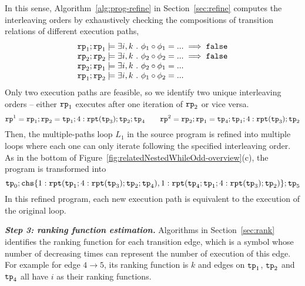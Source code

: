 In this sense, Algorithm~\ref{alg:prog-refine} in Section~\ref{sec:refine} computes the interleaving orders
by exhaustively checking the compositions of transition relations of different execution paths,
\begin{equation}
    \begin{array}{l}
        \mathtt{rp}_1 ; \mathtt{rp}_1 \models \exists i, k ~.~ \phi_1 \circ \phi_1 = ... \implies \mathtt{false}\\
        \mathtt{rp}_2 ; \mathtt{rp}_2 \models \exists i, k ~.~ \phi_2 \circ \phi_2 = ... \implies \mathtt{false} \\
        \mathtt{rp}_2 ; \mathtt{rp}_1 \models \exists i, k ~.~ \phi_2 \circ \phi_1 = ...  \\
        \mathtt{rp}_1 ; \mathtt{rp}_2 \models \exists i, k ~.~ \phi_1 \circ \phi_2 = ... 
    \end{array}
\end{equation}
Only two execution paths are feasible, so we identify two unique interleaving orders --
either $\mathtt{rp}_1$ executes after one iteration of $\mathtt{rp}_2$ or vice versa.
\[
    \mathtt{rp}^1 = \mathtt{rp}_1 ; \mathtt{rp}_2 = \mathtt{tp}_1; 4:\mathtt{rpt}(\mathtt{tp}_3); \mathtt{tp}_2; \mathtt{tp}_4
    \qquad
    \mathtt{rp}^2 = \mathtt{rp}_2 ; \mathtt{rp}_1 = \mathtt{tp}_4; \mathtt{tp}_1; 4:\mathtt{rpt}(\mathtt{tp}_3); \mathtt{tp}_2
\]
Then, the multiple-paths loop $L_1$ in the source program is refined
into multiple loops where each one can only iterate following the specified interleaving order.
As in the bottom of Figure~\ref{fig:relatedNestedWhileOdd-overview}(c),
the program is transformed into 
\[
    \tpath_0 ; \rpchoose{ 1: \rprepeat(\tpath_1; 4:\rprepeat(\tpath_3); \tpath_2; \tpath_4), 
1: \rprepeat(\tpath_4; \tpath_1; 4:\rprepeat(\tpath_3); \tpath_2) }; \tpath_5
\]
In this refined program, 
each new execution path is equivalent to the execution of the original loop. 

\textbf{\emph{Step 3: ranking function estimation.}}
Algorithms in Section~\ref{sec:rank} identifies the ranking function for each transition edge, which is a symbol whose number of decreasing times can represent the number of execution of this edge.
For example for edge $4 \to 5$, its ranking function is $k$ and edges on $\mathtt{tp}_1$, $\mathtt{tp}_2$ and $\mathtt{tp}_4$ all have $i$ as their ranking functions.

